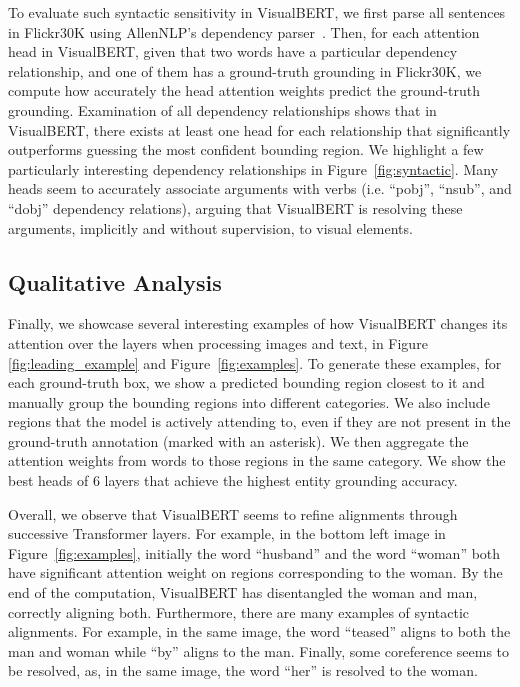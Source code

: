 \documentclass{article} \usepackage{iclr2019_conference,times}
\newcommand{\model}{VisualBERT\xspace}
\begin{document}
To evaluate such syntactic sensitivity in \model, we first parse all sentences in Flickr30K using AllenNLP's dependency parser~\citep{dozat2017deep,gardner2018allennlp}.
Then, for each attention head in \model, given that two words have a particular dependency relationship, and one of them has a ground-truth grounding in Flickr30K, we compute how accurately the head attention weights predict the ground-truth grounding. Examination of all dependency relationships shows that in \model, there exists at least one head for each relationship that significantly outperforms guessing the most confident bounding region. We highlight a few particularly interesting dependency relationships in Figure~\ref{fig:syntactic}. Many heads seem to accurately associate arguments with verbs (i.e. ``pobj'', ``nsub'', and ``dobj'' dependency relations), arguing that \model is resolving these arguments, implicitly and without supervision, to visual elements. 

\subsection{Qualitative Analysis}
\label{sec:casestudy}
Finally, we showcase several interesting examples of how
\model changes its attention over the layers when processing images and text, in Figure \ref{fig:leading_example} and Figure~\ref{fig:examples}. To generate these examples, for each ground-truth box, we show a predicted bounding region closest to it and manually group the bounding regions into different categories.
We also include regions that the model is actively attending to, even if they are not present in the ground-truth annotation (marked with an asterisk).
We then aggregate the attention weights from words to those regions in the same category. We show the best heads of 6 layers that achieve the highest entity grounding accuracy.

Overall, we observe that \model seems to refine alignments through successive Transformer layers.
For example, in the bottom left image in Figure~\ref{fig:examples}, initially the word ``husband'' and the word ``woman'' both have significant attention weight on regions corresponding to the woman. 
By the end of the computation, \model has disentangled the woman and man, correctly aligning both.
Furthermore, there are many examples of syntactic alignments.
For example, in the same image, the word ``teased''  aligns to both the man and woman while ``by'' aligns to the man.
Finally, some coreference seems to be resolved, as, in the same image, the word ``her'' is resolved to the woman.
\end{document}
